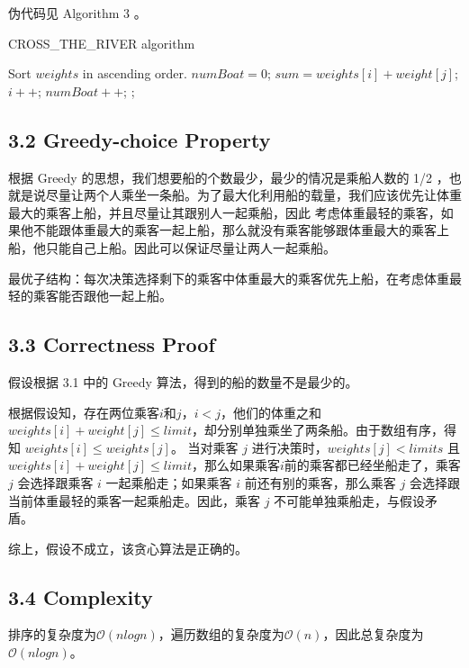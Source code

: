 \documentclass[UTF8]{ctexart}
\begin{document}
伪代码见 Algorithm 3 。
\begin{algorithm}[h]
	\caption{CROSS\_THE\_RIVER algorithm}
	\begin{algorithmic}[1]
        \State Sort $weights$ in ascending order. 
        \State $numBoat = 0$;
            \State $sum = weights[i] + weight[j]$;
                \State $i++$;
            \EndIf
        \State $numBoat ++$;
        \EndFor
		\State {} ;
		\EndFunction
	\end{algorithmic}
\end{algorithm}
\subsection*{3.2 Greedy-choice Property} 
根据 Greedy 的思想，我们想要船的个数最少，最少的情况是乘船人数的 1/2 ，也就是说尽量让两个人乘坐一条船。为了最大化利用船的载量，我们应该优先让体重最大的乘客上船，并且尽量让其跟别人一起乘船，因此
考虑体重最轻的乘客，如果他不能跟体重最大的乘客一起上船，那么就没有乘客能够跟体重最大的乘客上船，他只能自己上船。因此可以保证尽量让两人一起乘船。

最优子结构：每次决策选择剩下的乘客中体重最大的乘客优先上船，在考虑体重最轻的乘客能否跟他一起上船。
\subsection*{3.3 Correctness Proof} 
假设根据 3.1 中的 Greedy 算法，得到的船的数量不是最少的。

根据假设知，存在两位乘客$i$和$j$，$i < j$，他们的体重之和 $weights[i] + weight[j] \le limit$，却分别单独乘坐了两条船。由于数组有序，得知 $weights[i] \le weights[j]$。
当对乘客 $j$ 进行决策时，$weights[j] < limits$ 且 $ weights[i] + weight[j] \le limit $，那么如果乘客$i$前的乘客都已经坐船走了，乘客 $j$ 会选择跟乘客 $i$ 一起乘船走；如果乘客 $i$ 前还有别的乘客，那么乘客 $j$ 会选择跟
当前体重最轻的乘客一起乘船走。因此，乘客 $j$ 不可能单独乘船走，与假设矛盾。

综上，假设不成立，该贪心算法是正确的。
\subsection*{3.4 Complexity}
排序的复杂度为$\mathcal{O}(nlogn)$，遍历数组的复杂度为$\mathcal{O}(n)$，因此总复杂度为$\mathcal{O}(nlogn)$。
\end{document}
